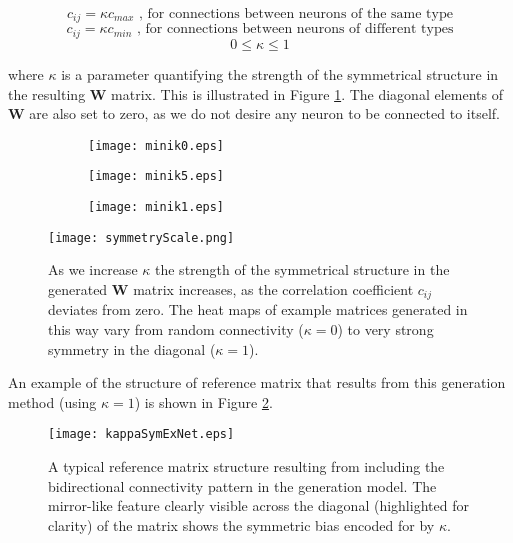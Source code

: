 \documentclass[12pt, a4paper]{article}
\begin{document}
    \begin{equation}        c_{ij} = \kappa c_{max} \text{  ,   for connections between neurons of the same type}    \end{equation}
    \begin{equation}        c_{ij} = \kappa c_{min} \text{  ,   for connections between neurons of different types}  \end{equation}
    \begin{equation}        0 \leq \kappa \leq 1                                        \end{equation}

where $\kappa$ is a parameter quantifying the strength of the symmetrical structure in the resulting $\mathbf{W}$ matrix. This is illustrated in Figure \ref{fig:symScale}.  The diagonal elements of $\mathbf{W}$ are also set to zero, as we do not desire any neuron to be connected to itself.

\begin{figure}

    \begin{subfigure}{0.24\columnwidth}
        \texttt{[image: minik0.eps]}
    \end{subfigure}
    \begin{subfigure}{0.24\columnwidth}
        \texttt{[image: minik5.eps]}
    \end{subfigure}
    \begin{subfigure}{0.24\columnwidth}
        \texttt{[image: minik1.eps]}
    \end{subfigure}   
    \hspace{0.13\columnwidth} 
    \centering
    \texttt{[image: symmetryScale.png]}
    \caption{As we increase $\kappa$ the strength of the symmetrical structure in the generated $\mathbf{W}$ matrix increases, as the correlation coefficient $c_{ij}$ deviates from zero.  The heat maps of example matrices generated in this way vary from random connectivity ($\kappa = 0$) to very strong symmetry in the diagonal ($\kappa = 1$).}
    \label{fig:symScale}
\end{figure}
    
An example of the structure of reference matrix that results from this generation method (using $\kappa = 1$) is shown in Figure \ref{fig:pairCorrW}.

\begin{figure}
    \centering
    \texttt{[image: kappaSymExNet.eps]}
    \caption{A typical reference matrix structure resulting from including the bidirectional connectivity pattern in the generation model. The mirror-like feature clearly visible across the diagonal (highlighted for clarity) of the matrix shows the symmetric bias encoded for by $\kappa$.}
    \label{fig:pairCorrW}
\end{figure}
\end{document}
